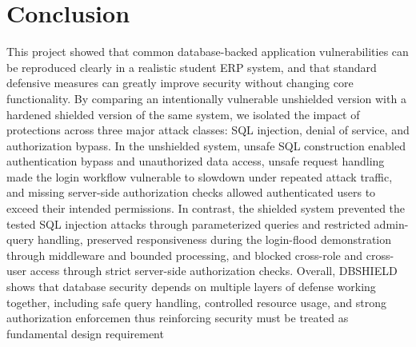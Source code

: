 \documentclass[11pt,a4paper]{article}
\begin{document}
\FloatBarrier %
\section{Conclusion}
This project showed that common database-backed application vulnerabilities can be reproduced clearly in a realistic student ERP system, and that standard defensive measures can greatly improve security without changing core functionality. By comparing an intentionally vulnerable unshielded version with a hardened shielded version of the same system, we isolated the impact of protections across three major attack classes: SQL injection, denial of service, and authorization bypass. In the unshielded system, unsafe SQL construction enabled authentication bypass and unauthorized data access, unsafe request handling made the login workflow vulnerable to slowdown under repeated attack traffic, and missing server-side authorization checks allowed authenticated users to exceed their intended permissions.
In contrast, the shielded system prevented the tested SQL injection attacks through parameterized queries and restricted admin-query handling, preserved responsiveness during the login-flood demonstration through middleware and bounded processing, and blocked cross-role and cross-user access through strict server-side authorization checks. Overall, DBSHIELD shows that database security depends on multiple layers of defense working together, including safe query handling, controlled resource usage, and strong authorization enforcemen thus reinforcing security must be treated as fundamental design requirement
\end{document}
